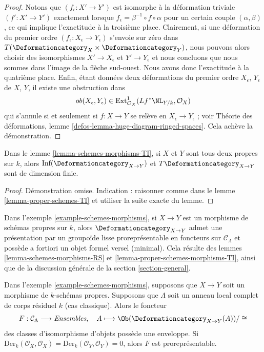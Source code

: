 \begin{proof}
Notons que $(f_\epsilon : X' \to Y')$ est isomorphe à la
déformation triviale $(f' : X' \to Y')$ exactement lorsque
$f_\epsilon  = \beta^{-1} \circ f \circ \alpha$ pour un certain
couple $(\alpha, \beta)$, ce qui implique l'exactitude à la troisième place.
Clairement, si une déformation du premier ordre
$(f_\epsilon : X_\epsilon \to Y_\epsilon)$
s'envoie sur zéro dans $T(\Deformationcategory_X \times \Deformationcategory_Y)$,
nous pouvons alors choisir des isomorphismes $X' \to X_\epsilon$ et $Y' \to Y_\epsilon$
et nous concluons que nous sommes dans l'image de la flèche sud-ouest.
Nous avons donc l'exactitude à la quatrième place.
Enfin, étant données deux déformations du premier ordre $X_\epsilon$, $Y_\epsilon$
de $X$, $Y$, il existe une obstruction dans
$$
ob(X_\epsilon, Y_\epsilon) \in
\text{Ext}^1_{\mathcal{O}_X}(Lf^*\NL_{Y/k}, \mathcal{O}_X)
$$
qui s'annule si et seulement si $f : X \to Y$ se relève en
$X_\epsilon \to Y_\epsilon$ ; voir
Théorie des déformations, lemme \ref{defos-lemma-huge-diagram-ringed-spaces}.
Cela achève la démonstration.
\end{proof}

\begin{lemma}
\label{lemma-proper-schemes-morphisms-TI}
Dans le lemme \ref{lemma-schemes-morphisms-TI}, si $X$ et $Y$ sont tous deux
propres sur $k$, alors
$\text{Inf}(\Deformationcategory_{X \to Y})$ et
$T\Deformationcategory_{X \to Y}$ sont de dimension finie.
\end{lemma}

\begin{proof}
Démonstration omise. Indication : raisonner comme dans le lemme \ref{lemma-proper-schemes-TI}
et utiliser la suite exacte du lemme.
\end{proof}

\noindent
Dans l'exemple \ref{example-schemes-morphisms},
si $X \to Y$ est un morphisme de schémas propres sur $k$,
alors $\Deformationcategory_{X \to Y}$
admet une présentation par un groupoïde lisse proreprésentable en foncteurs
sur $\mathcal{C}_\Lambda$
et possède a fortiori un objet formel versel (minimal). Cela résulte
des lemmes \ref{lemma-schemes-morphisms-RS} et
\ref{lemma-proper-schemes-morphisms-TI},
ainsi que de la discussion générale de la section \ref{section-general}.

\begin{lemma}
\label{lemma-schemes-morphisms-hull}
Dans l'exemple \ref{example-schemes-morphisms}, supposons que $X \to Y$
soit un morphisme de $k$-schémas propres.
Supposons que $\Lambda$ soit un anneau local complet de corps résiduel $k$
(cas classique). Alors le foncteur
$$
F : \mathcal{C}_\Lambda \longrightarrow \textit{Ensembles},\quad
A \longmapsto \Ob(\Deformationcategory_{X \to Y}(A))/\cong
$$
des classes d'isomorphisme d'objets possède une enveloppe. Si
$\text{Der}_k(\mathcal{O}_X, \mathcal{O}_X) =
\text{Der}_k(\mathcal{O}_Y, \mathcal{O}_Y) = 0$, alors
$F$ est proreprésentable.
\end{lemma}


